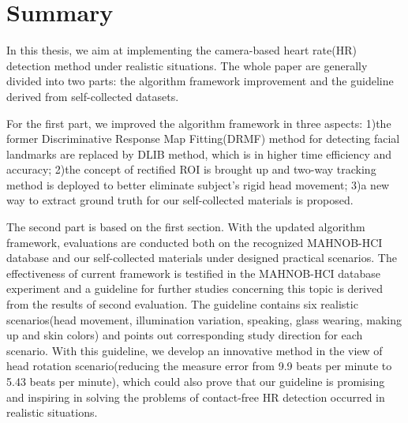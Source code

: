 \chapter{Summary}
In this thesis, we aim at implementing the camera-based heart rate(HR) detection method under realistic situations. The whole paper are generally divided into two parts: the algorithm framework improvement and the guideline derived from self-collected datasets. 

For the first part, we improved the algorithm framework in three aspects: 1)the former Discriminative Response Map Fitting(DRMF) method for detecting facial landmarks are replaced by DLIB method, which is in higher time efficiency and accuracy; 2)the concept of rectified ROI is brought up and two-way tracking method is deployed to better eliminate subject's rigid head movement; 3)a new way to extract ground truth for our self-collected materials is proposed. 

The second part is based on the first section. With the updated algorithm framework, evaluations are conducted both on the recognized MAHNOB-HCI database and our self-collected materials under designed practical scenarios. The effectiveness of current framework is testified in the MAHNOB-HCI database experiment and a guideline for further studies concerning this topic is derived from the results of second evaluation. The guideline contains six realistic scenarios(head movement, illumination variation, speaking, glass wearing, making up and skin colors) and points out corresponding study direction for each scenario. With this guideline, we develop an innovative method in the view of head rotation scenario(reducing the measure error from 9.9 beats per minute to 5.43 beats per minute), which could also prove that our guideline is promising and inspiring in solving the problems of contact-free HR detection occurred in realistic situations.  

